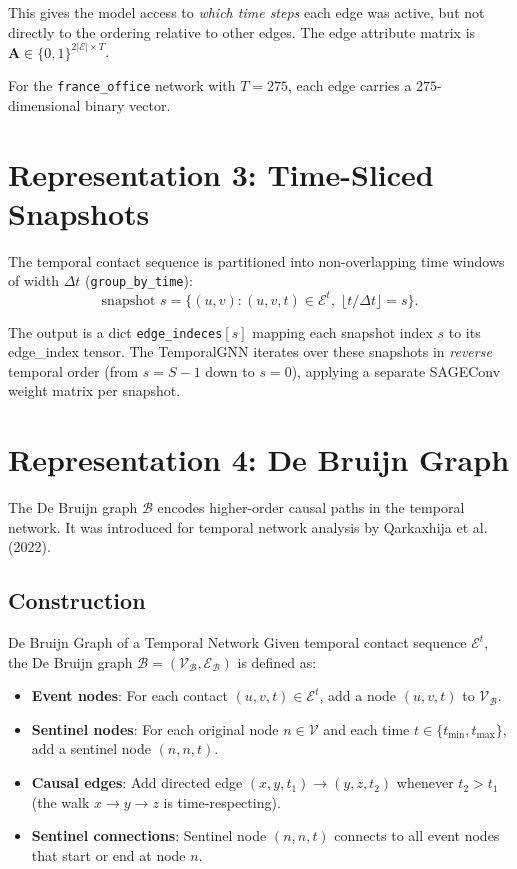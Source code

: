 \documentclass[12pt,a4paper]{report}
\newcommand{\calV}{\mathcal{V}}
\newcommand{\calE}{\mathcal{E}}
\newcommand{\calB}{\mathcal{B}}
\begin{document}
This gives the model access to \emph{which time steps} each edge was active, but
not directly to the ordering relative to other edges. The edge attribute matrix
is $\mathbf{A} \in \{0,1\}^{2|\calE| \times T}$.

For the \texttt{france\_office} network with $T=275$, each edge carries a
$275$-dimensional binary vector.

\section{Representation 3: Time-Sliced Snapshots}
\label{sec:snapshot_rep}

The temporal contact sequence is partitioned into non-overlapping time windows
of width $\Delta t$ (\texttt{group\_by\_time}):
\begin{equation}
  \text{snapshot } s = \{(u,v) : (u,v,t) \in \calE^t,\; \lfloor t/\Delta t \rfloor = s\}.
\end{equation}

The output is a dict \texttt{edge\_indeces}$[s]$ mapping each snapshot index $s$
to its edge\_index tensor. The TemporalGNN iterates over these snapshots in
\emph{reverse} temporal order (from $s = S-1$ down to $s = 0$), applying a
separate SAGEConv weight matrix per snapshot.

\section{Representation 4: De Bruijn Graph}
\label{sec:db_rep}

The De Bruijn graph $\mathcal{B}$ encodes higher-order causal paths in the
temporal network. It was introduced for temporal network analysis by
Qarkaxhija et al. (2022).

\subsection{Construction}

\begin{definition}{De Bruijn Graph of a Temporal Network}
Given temporal contact sequence $\calE^t$, the De Bruijn graph $\calB =
(\calV_\calB, \calE_\calB)$ is defined as:
\begin{itemize}
  \item \textbf{Event nodes}: For each contact $(u,v,t) \in \calE^t$, add a
    node $(u,v,t)$ to $\calV_\calB$.
  \item \textbf{Sentinel nodes}: For each original node $n \in \calV$ and each
    time $t \in \{t_{\min}, t_{\max}\}$, add a sentinel node $(n,n,t)$.
  \item \textbf{Causal edges}: Add directed edge $(x,y,t_1) \to (y,z,t_2)$
    whenever $t_2 > t_1$ (the walk $x \to y \to z$ is time-respecting).
  \item \textbf{Sentinel connections}: Sentinel node $(n,n,t)$ connects to all
    event nodes that start or end at node $n$.
\end{itemize}
\end{definition}
\end{document}
